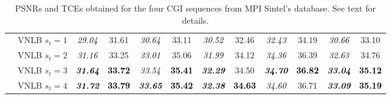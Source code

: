 \documentclass[10pt, journal, twocolumn, final, a4paper]{IEEEtran}
\newcommand{\best}[1]{#1}
\newcommand{\bsic}[1]{\textcolor{black}{\textit{#1}}}
\newcommand{\Bsic}[1]{\textcolor{black}{\textbf{\textit{#1}}}}
\newcommand{\Best}[1]{\textbf{\textcolor{black}{#1}}}
\begin{document}
\begin{table}[htp!]
\begin{center}
{\begin{tabular}{ c | l |c c | c c | c c | c c | c c}
			                      & VNLB   $s_t = 1$     & \bsic{29.04} &       31.61  & \bsic{30.64} &       33.11  & \bsic{30.52} &       32.46  & \bsic{32.43} &       34.19  & \bsic{30.66} &       33.10  \\
			                      & VNLB   $s_t = 2$     & \bsic{31.16} &       33.25  & \bsic{33.01} &       35.06  & \bsic{31.99} &       34.12  & \bsic{34.36} &       36.39  & \bsic{32.63} &       34.76  \\
			                      & VNLB   $s_t = 3$     & \Bsic{31.64} & \Best{33.72} & \bsic{33.54} & \Best{35.41} & \Bsic{32.29} & \best{34.50} & \Bsic{34.70} & \Best{36.82} & \Bsic{33.04} & \Best{35.12} \\
			                      & VNLB   $s_t = 4$     & \Bsic{31.72} & \Best{33.79} & \Bsic{33.65} & \Best{35.42} & \Bsic{32.38} & \Best{34.63} & \bsic{34.60} & \best{36.71} & \Bsic{33.09} & \Best{35.19} \\\hline
		\end{tabular}}
	\end{center}
	\caption{PSNRs and TCEs obtained for the four CGI sequences from MPI
	Sintel's database. See text for details.}
	\label{tab:sintel}
\end{table}
\end{document}
